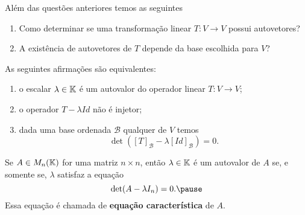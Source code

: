 \documentclass{beamer}
\begin{document}
    \begin{frame}
        Além das questões anteriores temos as seguintes\pause
        \vspace*{.5cm}
        \begin{enumerate}[label={\arabic*})]
            \item Como determinar se uma transformação linear $T \colon V \to V$ \pause possui autovetores?\pause

            \vspace*{2cm}

            \item A existência de autovetores de $T$ \pause depende da base escolhida para $V$?\pause
        \end{enumerate}
    \end{frame}

    \begin{frame}
        \begin{teorema}
            As seguintes afirmações são equivalentes:\pause
            \begin{enumerate}[label={\roman*})]
                \item o escalar $\lambda \in \mathbb{K}$ \pause é um autovalor do operador linear $T \colon V \to V$;\pause

                \vspace*{1cm}

                \item o operador $T - \lambda Id$ \pause não é injetor;\pause

                \vspace*{1cm}

                \item dada uma base ordenada $\mathcal{B}$ \pause qualquer de $V$ temos\pause
                \[
                    \det([T]_\mathcal{B} - \lambda[Id]_\mathcal{B}) = 0.
                \]
            \end{enumerate}
        \end{teorema}
    \end{frame}

    \begin{frame}
        \begin{teorema}
            Se $A \in M_n(\mathbb{K})$ \pause for uma matriz $n \times n$, \pause então $\lambda \in \mathbb{K}$ é um autovalor de $A$ \pause se, e somente se, $\lambda$ satisfaz a equação\pause
            \[
                \det(A - \lambda I_n) = 0.\pause
            \]
            Essa equação é chamada de \textbf{equação característica} de $A$.
        \end{teorema}
    \end{frame}
\end{document}
